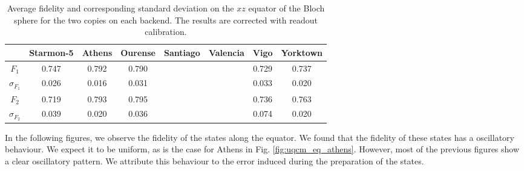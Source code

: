 \begin{table}[H]
    \centering
    \begin{tabular}{|c|c|c|c|c|c|c|c|}
    \hline
    \textbf{} & \textbf{Starmon-5} & \textbf{Athens} & \textbf{Ourense} & \textbf{Santiago} & \textbf{Valencia} & \textbf{Vigo} & \textbf{Yorktown} \\ \hline
    $F_1$              & 0.747 & 0.792 & 0.790 &  &  & 0.729 & 0.737\\ \hline
    $\sigma_{F_1}$     & 0.026 & 0.016 & 0.031 &  &  & 0.033 & 0.020 \\ \hline
    $F_2$              & 0.719 & 0.793 & 0.795 &  &  & 0.736 & 0.763 \\ \hline
    $\sigma_{F_2}$     & 0.039 & 0.020 & 0.036 &  &  & 0.074 & 0.020 \\ \hline
    \end{tabular}
    \caption{Average fidelity and corresponding standard deviation on the $xz$ equator of the Bloch sphere for the two copies on each backend. The results are corrected with readout calibration.}\label{tab:uqcm_results_eq}
\end{table}

In the following figures, we observe the fidelity of the states along the equator. We found that the fidelity of these states has a oscillatory behaviour. We expect it to be uniform, as is the case for Athens in Fig. \ref{fig:uqcm_eq_athens}. However, most of the previous figures show a clear oscillatory pattern. We attribute this behaviour to the error induced during the preparation of the states.

